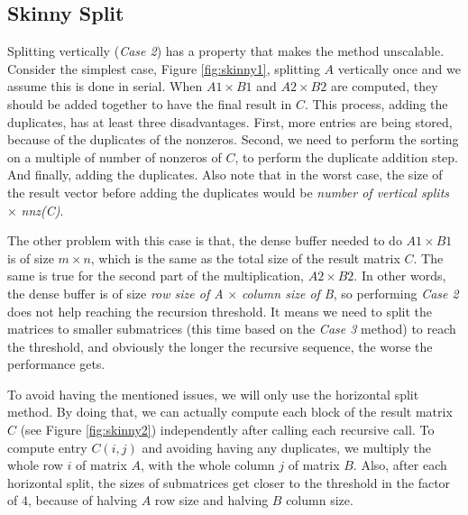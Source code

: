 \iffalse
\subsection{Skinny Split}
\label{sec:1split}


Splitting vertically (\textit{Case 2}) has a property that makes the method unscalable. Consider the simplest case, Figure \ref{fig:skinny1}, splitting $A$ vertically once and we assume this is done in serial. When $A1 \times B1$ and $A2 \times B2$ are computed, they should be added together to have the final result in $C$. This process, adding the duplicates, has at least three disadvantages. First, more entries are being stored, because of the duplicates of the nonzeros. Second, we need to perform the sorting on a multiple of number of nonzeros of $C$, to perform the duplicate addition step. And finally, adding the duplicates. Also note that in the worst case, the size of the result vector before adding the duplicates would be \textit{number of vertical splits} $\times$ \textit{nnz(C)}. 

The other problem with this case is that, the dense buffer needed to do $A1 \times B1$ is of size $m \times n$, which is the same as the total size of the result matrix $C$. The same is true for the second part of the multiplication, $A2 \times B2$. In other words, the dense buffer is of size \textit{row size of A} $\times$ \textit{column size of B}, so performing \textit{Case 2} does not help reaching the recursion threshold.
It means we need to split the matrices to smaller submatrices (this time based on the \textit{Case 3} method) to reach the threshold, and obviously the longer the recursive sequence, the worse the performance gets.

To avoid having the mentioned issues, we will only use the horizontal split method. By doing that, we can actually compute each block of the result matrix $C$ (see Figure \ref{fig:skinny2}) independently after calling each recursive call. To compute entry $C(i,j)$ and avoiding having any duplicates, we multiply the whole row $i$ of matrix $A$, with the whole column $j$ of matrix $B$. Also, after each horizontal split, the sizes of submatrices get closer to the threshold in the factor of $4$, because of halving $A$ row size and halving $B$ column size.

